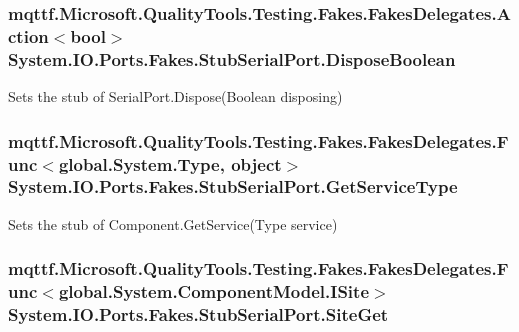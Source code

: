 \hypertarget{class_system_1_1_i_o_1_1_ports_1_1_fakes_1_1_stub_serial_port_af192542f588eacbad768ea6fd5d280e0}{
\subsubsection[{Dispose\-Boolean}]{\setlength{\rightskip}{0pt plus 5cm}mqttf.\-Microsoft.\-Quality\-Tools.\-Testing.\-Fakes.\-Fakes\-Delegates.\-Action$<$bool$>$ System.\-I\-O.\-Ports.\-Fakes.\-Stub\-Serial\-Port.\-Dispose\-Boolean}}\label{class_system_1_1_i_o_1_1_ports_1_1_fakes_1_1_stub_serial_port_af192542f588eacbad768ea6fd5d280e0}


Sets the stub of Serial\-Port.\-Dispose(\-Boolean disposing)

\hypertarget{class_system_1_1_i_o_1_1_ports_1_1_fakes_1_1_stub_serial_port_a06a81b245f804a49fc4ad1265a7a69f6}{
\subsubsection[{Get\-Service\-Type}]{\setlength{\rightskip}{0pt plus 5cm}mqttf.\-Microsoft.\-Quality\-Tools.\-Testing.\-Fakes.\-Fakes\-Delegates.\-Func$<$global.\-System.\-Type, object$>$ System.\-I\-O.\-Ports.\-Fakes.\-Stub\-Serial\-Port.\-Get\-Service\-Type}}\label{class_system_1_1_i_o_1_1_ports_1_1_fakes_1_1_stub_serial_port_a06a81b245f804a49fc4ad1265a7a69f6}


Sets the stub of Component.\-Get\-Service(\-Type service)

\hypertarget{class_system_1_1_i_o_1_1_ports_1_1_fakes_1_1_stub_serial_port_a0b6a764a2ad88d092e33cb38485e76fb}{
\subsubsection[{Site\-Get}]{\setlength{\rightskip}{0pt plus 5cm}mqttf.\-Microsoft.\-Quality\-Tools.\-Testing.\-Fakes.\-Fakes\-Delegates.\-Func$<$global.\-System.\-Component\-Model.\-I\-Site$>$ System.\-I\-O.\-Ports.\-Fakes.\-Stub\-Serial\-Port.\-Site\-Get}}\label{class_system_1_1_i_o_1_1_ports_1_1_fakes_1_1_stub_serial_port_a0b6a764a2ad88d092e33cb38485e76fb}


